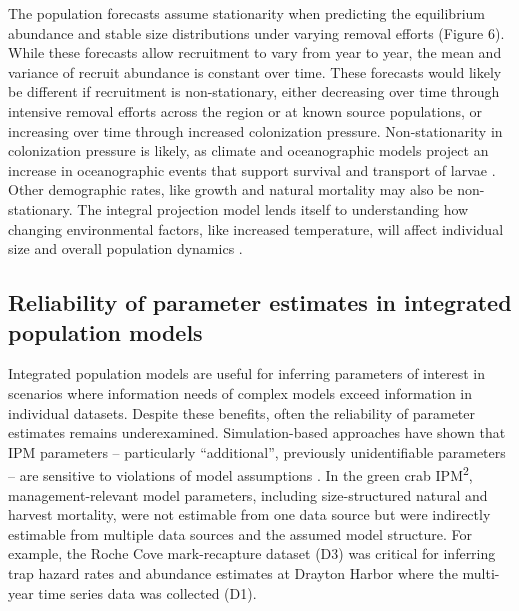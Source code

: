 \documentclass{article}
\begin{document}
The population forecasts assume stationarity when predicting the equilibrium abundance and stable size distributions under varying removal efforts (Figure 6). While these forecasts allow recruitment to vary from year to year, the mean and variance of recruit abundance is constant over time. These forecasts would likely be different if recruitment is non-stationary, either decreasing over time through intensive removal efforts across the region or at known source populations, or increasing over time through increased colonization pressure. Non-stationarity in colonization pressure is likely, as climate and oceanographic models project an increase in oceanographic events that support survival and transport of larvae \parencite{du2024dispersal, cai2021changing}. Other demographic rates, like growth and natural mortality may also be non-stationary. The integral projection model lends itself to understanding how changing environmental factors, like increased temperature, will affect individual size and overall population dynamics \parencite{plard2019ipm, dahlgren2011incorporating}. 

\subsection{Reliability of parameter estimates in integrated population models}

Integrated population models are useful for inferring parameters of interest in scenarios where information needs of complex models exceed information in individual datasets. Despite these benefits, often the reliability of parameter estimates remains underexamined. Simulation-based approaches have shown that IPM parameters -- particularly “additional”, previously unidentifiable parameters -- are sensitive to violations of model assumptions \parencite{riecke2019integrated}. In the green crab IPM\textsuperscript{2}, management-relevant model parameters, including size-structured natural and harvest mortality, were not estimable from one data source but were indirectly estimable from multiple data sources and the assumed model structure. For example, the Roche Cove mark-recapture dataset (D3) was critical for inferring trap hazard rates and abundance estimates at Drayton Harbor where the multi-year time series data was collected (D1).
\end{document}

